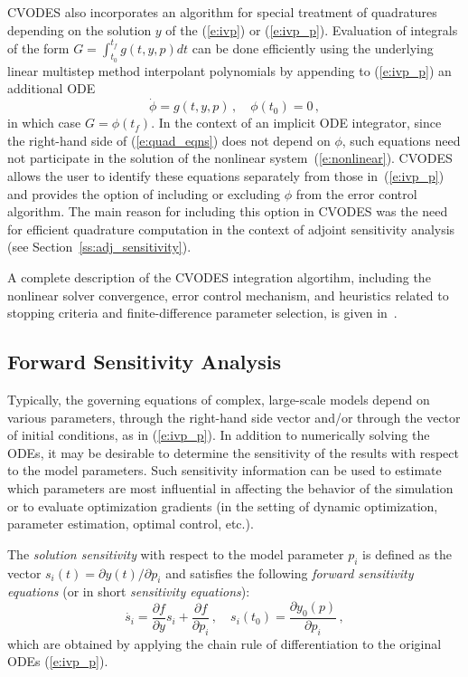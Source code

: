 CVODES also incorporates an algorithm for special treatment of
quadratures depending on the solution $y$ of the (\ref{e:ivp}) or
(\ref{e:ivp_p}). Evaluation of integrals of the form
$G = \int_{t_0}^{t_f} g(t,y,p) dt$ can be done efficiently using the
underlying linear multistep method interpolant polynomials by
appending to (\ref{e:ivp_p}) an additional ODE
\begin{equation}\label{e:quad_eqns}
\dot\phi = g(t,y,p) \, , \quad \phi(t_0) = 0 \, ,
\end{equation}
in which case $G = \phi(t_f)$. In the context of an implicit ODE
integrator, since the right-hand side of (\ref{e:quad_eqns}) does not
depend on $\phi$, such equations need not participate in the solution of
the nonlinear system~(\ref{e:nonlinear}). CVODES allows the user to
identify these equations separately from those in~(\ref{e:ivp_p}) and
provides the option of including or excluding $\phi$ from the error
control algorithm.
%
The main reason for including this option in CVODES was the need for
efficient quadrature computation in the context of adjoint sensitivity 
analysis (see Section~\ref{ss:adj_sensitivity}).

A complete description of the CVODES integration algortihm, including 
the nonlinear solver convergence, error control mechanism, and heuristics 
related to stopping criteria and finite-difference parameter selection, is
given in~\cite{HBGLSSW:03}.


\subsection{Forward Sensitivity Analysis}\label{ss:fwd_sensitivity}

Typically, the governing equations of complex, large-scale models
depend on various parameters,  through the right-hand side vector 
and/or through the vector of initial conditions, as in (\ref{e:ivp_p}).
In addition to numerically solving the ODEs, it may be desirable to
determine the sensitivity of the results with respect to the model
parameters. 
Such sensitivity information can be used to estimate which
parameters are most influential in affecting the behavior of the
simulation or to evaluate optimization gradients (in the setting of dynamic
optimization, parameter estimation, optimal control, etc.).

The {\em solution sensitivity} with respect to the model parameter
$p_i$ is defined as the vector 
$s_i (t) = {\partial y(t)}/{\partial p_i}$
and satisfies the following {\em forward sensitivity equations}
(or in short {\em sensitivity equations}):
\begin{equation}\label{e:sens_eqns}
\dot{s_i}  = \frac{\partial f}{\partial y} s_i + \frac{\partial f}{\partial p_i} \, ,
\quad s_i(t_0)  = \frac{\partial y_{0}(p)}{\partial p_i} \, ,
\end{equation}
which are obtained by applying the chain rule of differentiation to the original
ODEs (\ref{e:ivp_p}). 

